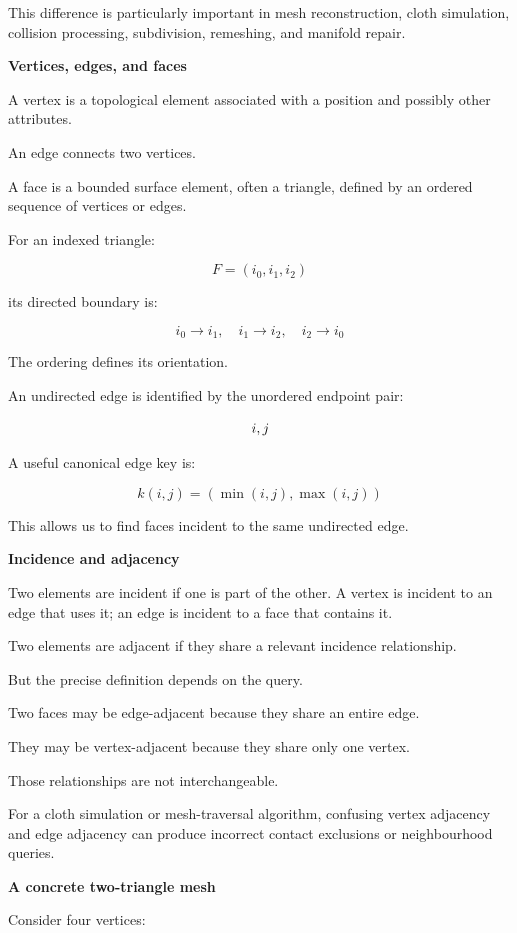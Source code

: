 This difference is particularly important in mesh reconstruction, cloth simulation, collision processing, subdivision, remeshing, and manifold repair.

\textbf{Vertices, edges, and faces}

A vertex is a topological element associated with a position and possibly other attributes.

An edge connects two vertices.

A face is a bounded surface element, often a triangle, defined by an ordered sequence of vertices or edges.

For an indexed triangle:

\[
F=(i_0,i_1,i_2)
\]

its directed boundary is:

\[
i_0\rightarrow i_1,\quad i_1\rightarrow i_2,\quad i_2\rightarrow i_0
\]

The ordering defines its orientation.

An undirected edge is identified by the unordered endpoint pair:

\[
\\{i,j\\}
\]

A useful canonical edge key is:

\[
\boxed{ k(i,j)=(\min(i,j),\max(i,j)) }
\]

This allows us to find faces incident to the same undirected edge.

\textbf{Incidence and adjacency}

Two elements are incident if one is part of the other. A vertex is incident to an edge that uses it; an edge is incident to a face that contains it.

Two elements are adjacent if they share a relevant incidence relationship.

But the precise definition depends on the query.

Two faces may be edge-adjacent because they share an entire edge.

They may be vertex-adjacent because they share only one vertex.

Those relationships are not interchangeable.

For a cloth simulation or mesh-traversal algorithm, confusing vertex adjacency and edge adjacency can produce incorrect contact exclusions or neighbourhood queries.

\textbf{A concrete two-triangle mesh}

Consider four vertices:

